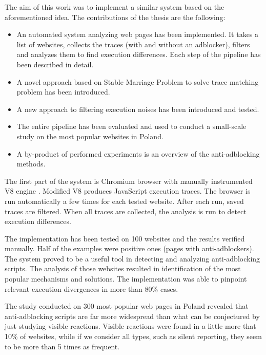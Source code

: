 The aim of this work was to implement a similar system based on the aforementioned idea.
The contributions of the thesis are the following:
\begin{itemize}
  \item An automated system analyzing web pages has been implemented.
           It takes a list of websites, collects the traces (with and without an adblocker), 
           filters and analyzes them to find execution differences. 
           Each step of the pipeline has been described in detail.
  \item A novel approach based on Stable Marriage Problem to solve trace matching problem
           has been introduced.
  \item A new approach to filtering execution noises has been introduced and tested.
  \item The entire pipeline has been evaluated and used to conduct a small-scale study on the most
           popular websites in Poland.
  \item A by-product of performed experiments is an overview of the anti-adblocking methods.
\end{itemize}

The first part of the system is Chromium browser with manually instrumented V8 engine \cite{v8:main-page}.
Modified V8 produces JavaScript execution traces. 
The browser is run automatically a few times for each tested website.
After each run, saved traces are filtered. When all traces are collected, 
the analysis is run to detect execution differences.

The implementation has been tested on 100 websites and the results verified manually. 
Half of the examples were positive ones (pages with anti-adblockers).
The system proved to be a useful tool in detecting and analyzing anti-adblocking scripts. 
The analysis of those websites resulted in identification of the most popular 
mechanisms and solutions. The implementation was able to pinpoint relevant 
execution divergences in more than 80\% cases.

The study conducted on 300 most popular web pages in Poland revealed that anti-adblocking scripts
are far more widespread than what can be conjectured by just studying visible reactions.
Visible reactions were found in a little more that 10\% of websites, while if we consider all types,
such as silent reporting, they seem to be more than 5 times as frequent.
